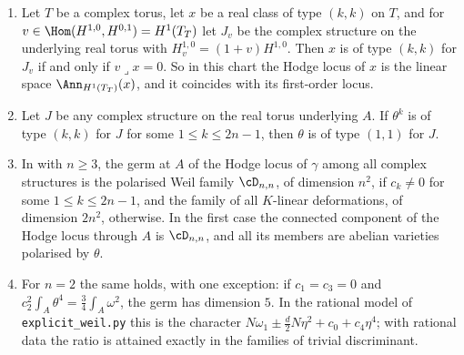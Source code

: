 \begin{proposition}
\label{prop:p2primelocus}
\begin{enumerate}[label=\textup{(\roman*)},leftmargin=2.6em,itemsep=2pt]
\item Let $T$ be a complex torus, let $x$ be a real class of type $(k,k)$ on
  $T$, and for $v\in\Hom(H^{1,0},H^{0,1})=H^{1}(T_{T})$ let $J_{v}$ be the
  complex structure on the underlying real torus with $H^{1,0}_{v}=(1+v)H^{1,0}$.
  Then $x$ is of type $(k,k)$ for $J_{v}$ if and only if $v\lrcorner x=0$. So
  in this chart the Hodge locus of $x$ is the linear space
  $\Ann_{H^{1}(T_{T})}(x)$, and it coincides with its first-order locus.
\item Let $J$ be any complex structure on the real torus underlying $A$. If
  $\theta^{k}$ is of type $(k,k)$ for $J$ for some $1\le k\le2n-1$, then
  $\theta$ is of type $(1,1)$ for $J$.
\item In  with $n\ge3$, the germ at $A$ of the Hodge locus
  of $\gamma$ among all complex structures is the polarised Weil family
  $\cD_{n,n}$, of dimension $n^{2}$, if $c_{k}\ne0$ for some $1\le k\le2n-1$,
  and the family of all $K$-linear deformations, of dimension $2n^{2}$,
  otherwise. In the first case the connected component of the Hodge locus
  through $A$ is $\cD_{n,n}$, and all its members are abelian varieties
  polarised by $\theta$.
\item For $n=2$ the same holds, with one exception: if $c_{1}=c_{3}=0$ and
  $c_{2}^{2}\int_{A}\theta^{4}=\tfrac34\int_{A}\omega^{2}$, the germ has
  dimension $5$. In the rational model of \texttt{explicit\_weil.py} this is
  the character $N\omega_{1}\pm\tfrac{d}{2}N\eta^{2}+c_{0}+c_{4}\eta^{4}$;
  with rational data the ratio is attained exactly in the families of trivial
  discriminant.
\end{enumerate}
\end{proposition}

